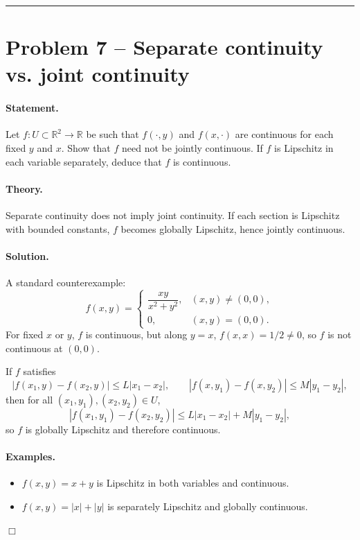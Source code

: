 \documentclass[12pt,a4paper]{article}
\theoremstyle{plain}
\theoremstyle{definition}
\theoremstyle{remark}
\theoremstyle{remark}
\begin{document}
\bigskip\hrule\bigskip

\section*{Problem 7 -- Separate continuity vs. joint continuity}

\paragraph{Statement.}
Let $f:U\subset\mathbb{R}^2\to\mathbb{R}$ be such that
$f(\cdot,y)$ and $f(x,\cdot)$ are continuous for each fixed $y$ and $x$.
Show that $f$ need not be jointly continuous.
If $f$ is Lipschitz in each variable separately, deduce that $f$ is continuous.

\paragraph{Theory.}
Separate continuity does not imply joint continuity.
If each section is Lipschitz with bounded constants, $f$ becomes globally Lipschitz, hence jointly continuous.

\paragraph{Solution.}
A standard counterexample:
\[
f(x,y)=
\begin{cases}
	\dfrac{xy}{x^2+y^2}, & (x,y)\ne(0,0),\\[4pt]
	0,&(x,y)=(0,0).
\end{cases}
\]
For fixed $x$ or $y$, $f$ is continuous, but along $y=x$,
$f(x,x)=1/2\ne0$, so $f$ is not continuous at $(0,0)$.

If $f$ satisfies
\[
|f(x_1,y)-f(x_2,y)|\le L|x_1-x_2|,\qquad
|f(x,y_1)-f(x,y_2)|\le M|y_1-y_2|,
\]
then for all $(x_1,y_1),(x_2,y_2)\in U$,
\[
|f(x_1,y_1)-f(x_2,y_2)|\le L|x_1-x_2|+M|y_1-y_2|,
\]
so $f$ is globally Lipschitz and therefore continuous.

\paragraph{Examples.}
\begin{itemize}
	\item $f(x,y)=x+y$ is Lipschitz in both variables and continuous.
	\item $f(x,y)=|x|+|y|$ is separately Lipschitz and globally continuous.
\end{itemize}
\hfill$\Box$
\end{document}
